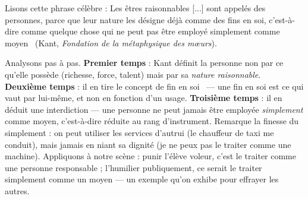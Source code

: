 \documentclass[11pt]{article}
\begin{document}
\begin{experience}
Lisons cette phrase célèbre : \guillemotleft Les êtres raisonnables [...] sont appelés des personnes, parce que leur nature les désigne déjà comme des fins en soi, c'est-à-dire comme quelque chose qui ne peut pas être employé simplement comme moyen \guillemotright\ (Kant, \emph{Fondation de la métaphysique des mœurs}).

Analysons pas à pas. \textbf{Premier temps} : Kant définit la personne non par ce qu'elle possède (richesse, force, talent) mais par sa \emph{nature raisonnable}. \textbf{Deuxième temps} : il en tire le concept de \guillemotleft fin en soi \guillemotright\ — une fin en soi est ce qui vaut par lui-même, et non en fonction d'un usage. \textbf{Troisième temps} : il en déduit une interdiction — une personne ne peut jamais être employée \emph{simplement} comme moyen, c'est-à-dire réduite au rang d'instrument. Remarque la finesse du \guillemotleft simplement \guillemotright : on peut utiliser les services d'autrui (le chauffeur de taxi me conduit), mais jamais en niant sa dignité (je ne peux pas le traiter comme une machine). Appliquons à notre scène : punir l'élève voleur, c'est le traiter comme une personne responsable ; l'humilier publiquement, ce serait le traiter simplement comme un moyen — un exemple qu'on exhibe pour effrayer les autres.
\end{experience}
\end{document}
